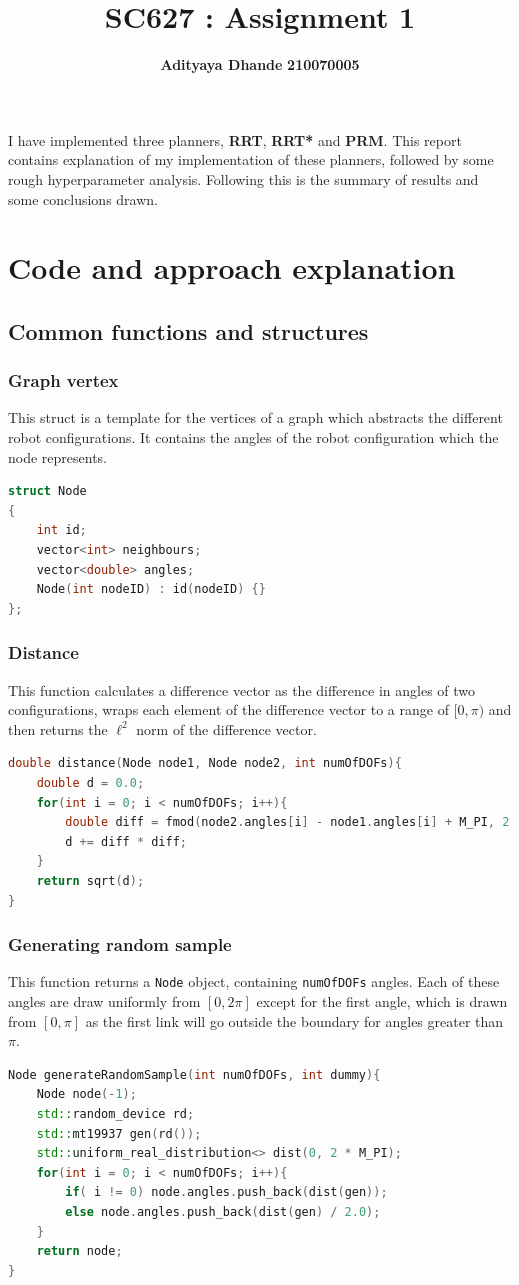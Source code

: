 \documentclass[11pt]{article}
\title{\textbf{SC627 : Assignment 1}}
\author{\textbf{Adityaya Dhande}   \hspace{8mm} \textbf{210070005}}
\date{}
\begin{document}
\maketitle
\noindent
I have implemented three planners, \textbf{RRT}, \textbf{RRT*} and \textbf{PRM}. This report contains 
explanation of my implementation of these planners, followed by some 
rough hyperparameter analysis. Following this is the summary of results and 
some conclusions drawn. 
\section{Code and approach explanation}
\subsection{Common functions and structures}
\subsubsection{Graph vertex}
This struct is a template for the vertices of a graph which abstracts the different robot configurations.
It contains the angles of the robot configuration which the node represents.
\begin{lstlisting}[language=c++]
struct Node
{
    int id;
    vector<int> neighbours;
    vector<double> angles;
    Node(int nodeID) : id(nodeID) {}
};    
\end{lstlisting}
\subsubsection{Distance}
This function calculates a difference vector as the difference in angles of two configurations, wraps each element of the difference vector to a range of $[0, \pi)$
and then returns the $\ell^2$ norm of the difference vector.
\begin{lstlisting}[language=c++]
double distance(Node node1, Node node2, int numOfDOFs){
	double d = 0.0;
	for(int i = 0; i < numOfDOFs; i++){
		double diff = fmod(node2.angles[i] - node1.angles[i] + M_PI, 2 * M_PI) - M_PI;
		d += diff * diff;
	}
	return sqrt(d); 
}
\end{lstlisting}

\subsubsection{Generating random sample}
This function returns a \texttt{Node} object, containing \texttt{numOfDOFs} angles. Each of these angles are draw uniformly from 
$[0, 2\pi]$ except for the first angle, which is drawn from $[0, \pi]$ as the first link will go outside the boundary for angles greater than $\pi$.
\begin{lstlisting}[language=c++]
Node generateRandomSample(int numOfDOFs, int dummy){
    Node node(-1);
    std::random_device rd;
    std::mt19937 gen(rd());
    std::uniform_real_distribution<> dist(0, 2 * M_PI);
    for(int i = 0; i < numOfDOFs; i++){
        if( i != 0) node.angles.push_back(dist(gen));
        else node.angles.push_back(dist(gen) / 2.0);
    }
    return node; 
}    
\end{lstlisting}
\end{document}

